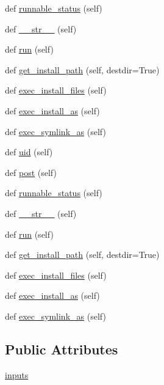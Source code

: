 \begin{DoxyCompactItemize}
\item 
def \hyperlink{classwaflib_1_1_build_1_1inst_affb0a840290ad8e000488cc0099950ed}{runnable\+\_\+status} (self)
\item 
def \hyperlink{classwaflib_1_1_build_1_1inst_a32507c568f479fd6409906270834783e}{\+\_\+\+\_\+str\+\_\+\+\_\+} (self)
\item 
def \hyperlink{classwaflib_1_1_build_1_1inst_a0d03fc4440c06aff0a927181771439be}{run} (self)
\item 
def \hyperlink{classwaflib_1_1_build_1_1inst_ac41fdf31d2133d81d941b1bd68ed31f6}{get\+\_\+install\+\_\+path} (self, destdir=True)
\item 
def \hyperlink{classwaflib_1_1_build_1_1inst_abf856d52d82ec26f4cc6f76a7c01ac8b}{exec\+\_\+install\+\_\+files} (self)
\item 
def \hyperlink{classwaflib_1_1_build_1_1inst_a0c951c9f7df7638fd030f2b4e1822a62}{exec\+\_\+install\+\_\+as} (self)
\item 
def \hyperlink{classwaflib_1_1_build_1_1inst_adf421fc92d636c0b2380b8fcd1a54de6}{exec\+\_\+symlink\+\_\+as} (self)
\item 
def \hyperlink{classwaflib_1_1_build_1_1inst_af3a833db8b118c295a773017f405de79}{uid} (self)
\item 
def \hyperlink{classwaflib_1_1_build_1_1inst_a747341176f2295022038ca17cf839769}{post} (self)
\item 
def \hyperlink{classwaflib_1_1_build_1_1inst_affb0a840290ad8e000488cc0099950ed}{runnable\+\_\+status} (self)
\item 
def \hyperlink{classwaflib_1_1_build_1_1inst_a32507c568f479fd6409906270834783e}{\+\_\+\+\_\+str\+\_\+\+\_\+} (self)
\item 
def \hyperlink{classwaflib_1_1_build_1_1inst_a0d03fc4440c06aff0a927181771439be}{run} (self)
\item 
def \hyperlink{classwaflib_1_1_build_1_1inst_ac41fdf31d2133d81d941b1bd68ed31f6}{get\+\_\+install\+\_\+path} (self, destdir=True)
\item 
def \hyperlink{classwaflib_1_1_build_1_1inst_abf856d52d82ec26f4cc6f76a7c01ac8b}{exec\+\_\+install\+\_\+files} (self)
\item 
def \hyperlink{classwaflib_1_1_build_1_1inst_a0c951c9f7df7638fd030f2b4e1822a62}{exec\+\_\+install\+\_\+as} (self)
\item 
def \hyperlink{classwaflib_1_1_build_1_1inst_adf421fc92d636c0b2380b8fcd1a54de6}{exec\+\_\+symlink\+\_\+as} (self)
\end{DoxyCompactItemize}
\subsection*{Public Attributes}
\begin{DoxyCompactItemize}
\item 
\hyperlink{classwaflib_1_1_build_1_1inst_a89563182286a4f653e2768d49aefcb40}{inputs}
\end{DoxyCompactItemize}
